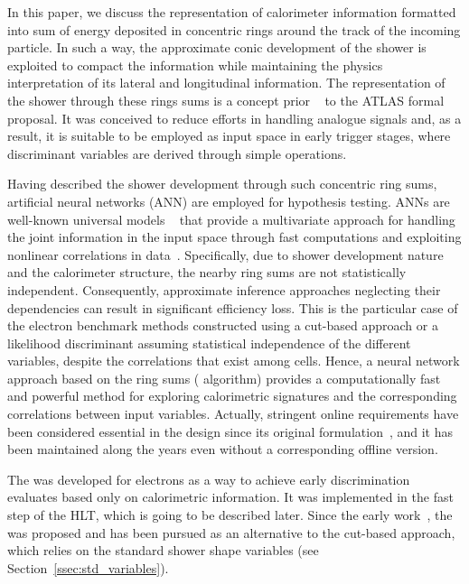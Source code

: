In this paper, we discuss the representation of calorimeter information formatted into sum of energy deposited in concentric rings around the track of the incoming particle. In such a way, the approximate conic development of the shower is exploited to compact the information while maintaining the physics interpretation of its lateral and longitudinal information. The representation of the shower through these rings sums is a concept prior ~\cite{1992_spacal_rings} to the ATLAS formal proposal. It was conceived to reduce efforts in handling analogue signals and, as a result, it is suitable to be employed as input space in early trigger stages, where discriminant variables are derived through simple operations.


Having described the shower development through such concentric ring sums,  artificial neural networks (ANN) are employed for hypothesis testing.  ANNs are well-known universal models ~\cite{haykin_2008} that provide a multivariate approach for handling the joint information in the input space through fast computations and exploiting nonlinear correlations in data~\cite{Duda}. Specifically, due to shower development nature and the calorimeter structure, the nearby ring sums are not statistically independent. Consequently, approximate inference approaches neglecting their dependencies can result in significant efficiency loss. This is the particular case of the electron benchmark methods constructed using a cut-based approach or a likelihood discriminant assuming statistical independence of the different variables, despite the correlations that exist among cells.  Hence, a neural network approach based on the ring sums (\rnn{} algorithm) provides a computationally fast and powerful method for exploring calorimetric signatures and the corresponding correlations between input variables. Actually, stringent online requirements have been considered essential in the \rnn{} design since its original formulation~\cite{1995_seixas_ringer}, and it has been maintained along the years even without a corresponding offline version.

The \rnn{} was developed for electrons as a way to achieve early discrimination evaluates based only on calorimetric information. It was implemented in the fast step of the HLT, which is going to be described later. Since the early work~\cite{1995_seixas_ringer}, the \rnn{} was proposed and has been pursued as an alternative to the cut-based approach, which relies on the standard shower shape variables (see Section~\ref{ssec:std_variables}).


